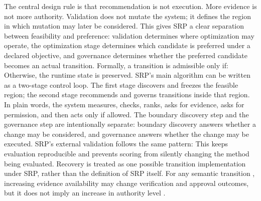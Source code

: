 {}The central design rule is that recommendation is not execution. More evidence is not more authority. Validation does not mutate the system; it defines the region in which mutation may later be considered.\markdownRendererParagraphSeparator
{}This gives SRP a clear separation between feasibility and preference: validation determines where optimization may operate, the optimization stage determines which candidate is preferred under a declared objective, and governance determines whether the preferred candidate becomes an actual transition.\markdownRendererParagraphSeparator
{}Formally, a transition is admissible only if:\markdownRendererInterblockSeparator
{}\markdownRendererInterblockSeparator
{}Otherwise, the runtime state is preserved.\markdownRendererInterblockSeparator
{}
\markdownRendererSectionEnd \markdownRendererSectionBegin
{}\markdownRendererInterblockSeparator
{}SRP's main algorithm can be written as a two-stage control loop. The first stage discovers and freezes the feasible region; the second stage recommends and governs transitions inside that region.\markdownRendererParagraphSeparator
{}In plain words, the system measures, checks, ranks, asks for evidence, asks for permission, and then acts only if allowed.\markdownRendererInterblockSeparator
{}\markdownRendererInterblockSeparator
{}The boundary discovery step and the governance step are intentionally separate: boundary discovery answers whether a change may be considered, and governance answers whether the change may be executed.\markdownRendererParagraphSeparator
{}SRP's external validation follows the same pattern:\markdownRendererInterblockSeparator
{}\markdownRendererInterblockSeparator
{}This keeps evaluation reproducible and prevents scoring from silently changing the method being evaluated.\markdownRendererSoftLineBreak
{}Recovery is treated as one possible transition implementation under SRP, rather than the definition of SRP itself.\markdownRendererInterblockSeparator
{}
\markdownRendererSectionEnd \markdownRendererSectionBegin
{}\markdownRendererInterblockSeparator
{}For any semantic transition , increasing evidence availability  may change verification and approval outcomes, but it does not imply an increase in authority level .\markdownRendererParagraphSeparator
